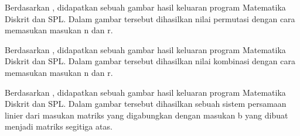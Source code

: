 \documentclass[../main.tex]{subfiles}
\begin{document}
    \begin{indentpar}
        \hspace{\parindent}Berdasarkan , didapatkan sebuah gambar hasil keluaran program Matematika Diskrit dan SPL. Dalam gambar tersebut dihasilkan nilai permutasi dengan cara memasukan masukan n dan r.
    \end{indentpar}

    \blanktop
    \begin{indentpar}
        \hspace{\parindent}Berdasarkan , didapatkan sebuah gambar hasil keluaran program Matematika Diskrit dan SPL. Dalam gambar tersebut dihasilkan nilai kombinasi dengan cara memasukan masukan n dan r.
    \end{indentpar}

    \begin{indentpar}
        \hspace{\parindent}Berdasarkan , didapatkan sebuah gambar hasil keluaran program Matematika Diskrit dan SPL. Dalam gambar tersebut dihasilkan sebuah sistem persamaan linier dari masukan matriks yang digabungkan dengan masukan b yang dibuat menjadi matriks segitiga atas.
    \end{indentpar}
\end{document}
